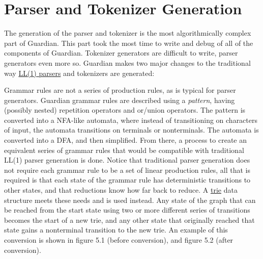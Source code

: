 
\section{Parser and Tokenizer Generation}
{
	The generation of the parser and tokenizer is the most
	algorithmically complex part of Guardian.
	This part took the most time to write
	and debug of all of the components of Guardian.
	Tokenizer generators are difficult to write, parser generators even more
	so.
	Guardian makes two major changes to the traditional
	way \href{https://en.wikipedia.org/wiki/LL_parser}{LL(1) parsers}
	and tokenizers are generated:
	
	\begin{enumerate}
	{
		\item Grammar rules are not a series of production rules, as is
			typical for parser generators. Guardian grammar rules are
			described using a \textit{pattern}, having (possibly nested)
			repetition
			operators and or/union operators.
			The pattern is converted into a NFA-like automata, where instead
			of transitioning on characters of input, the automata transitions
			on terminals or nonterminals. The automata is converted into a
			DFA, and then simplified. From there, a process to create an
			equivalent series of grammar rules that would be compatible
			with traditional LL(1) parser generation is done. Notice
			that traditional parser generation does not require each grammar
			rule to be a set of linear production rules, all that is required
			is that each state of the grammar rule has
			deterministic transitions to other states,
			and that reductions know how far back to reduce.
			A \href{https://en.wikipedia.org/wiki/Trie}{trie} data structure meets these needs and is used instead.
			Any state of the graph that can be reached from the start state
			using two or more different series of transitions becomes
			the start of a
			new trie,
			and any other state that originally reached that state gains a
			nonterminal transition to the new trie. An example of this
			conversion is shown in figure 5.1 (before conversion), and
			figure 5.2 (after conversion).
			
			\begin{figure}
				\begin{center}
\end{center}
\end{figure}}
\end{enumerate}}
